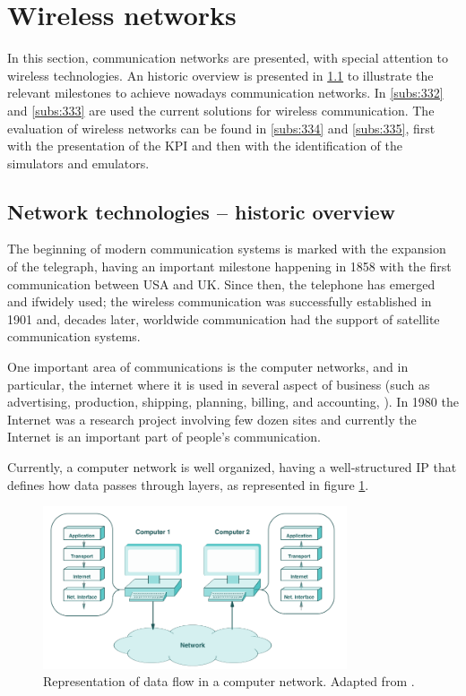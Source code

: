 



\section{Wireless networks}

In this section, communication networks are presented, with special attention to wireless technologies. 
An historic overview is presented in \ref{subs:331} to illustrate the relevant milestones to achieve nowadays communication networks.  
In \ref{subs:332} and \ref{subs:333} are used the current solutions for wireless communication.
The evaluation of wireless networks can be found in \ref{subs:334} and \ref{subs:335}, first with the presentation of the \ac{KPI} and then with the identification of the simulators and emulators.


\subsection{Network technologies – historic overview}
\label{subs:331}
The beginning of modern communication systems is marked with the expansion of the telegraph, having an important milestone happening in 1858 with the first communication between USA and UK. Since then, the telephone has emerged and ifwidely used; the wireless communication was successfully established in 1901 and, decades later, worldwide communication had the support of satellite communication systems.

One important area of communications is the computer networks, and in particular, the internet where it is used in several aspect of business (such as advertising, production, shipping, planning, billing, and accounting, \cite{comer2008}). In 1980 the Internet was a research project involving few dozen sites and currently the Internet is an important part of people’s communication.

Currently, a computer network is well organized, having a well-structured \ac{IP} that defines how data passes through layers, as represented in figure \ref{fig:comer2008}.

	\begin{figure}[h!]
	\centering
	\includegraphics[width=0.8\textwidth,keepaspectratio]{figures/33.WirelessN/comer2008}
	\caption{Representation of data flow in a computer network. Adapted from \cite{comer2008}.}
	\label{fig:comer2008}
\end{figure}



